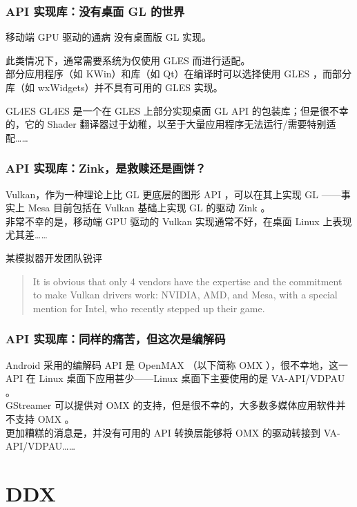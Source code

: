 \documentclass{ctexbeamer}
\begin{document}
\begin{frame}
    \frametitle{API 实现库：没有桌面 GL 的世界}
    \begin{block}{移动端 GPU 驱动的通病}
        没有桌面版 GL 实现。
    \end{block}
    此类情况下，通常需要系统为仅使用 GLES 而进行适配。 \\
    部分应用程序（如 KWin）和库（如 Qt）在编译时可以选择使用 GLES ，而部分库（如 wxWidgets）并不具有可用的 GLES 实现。\\
    \begin{block}{GL4ES}
        GL4ES 是一个在 GLES 上部分实现桌面 GL API 的包装库；但是很不幸的，它的 Shader 翻译器过于幼稚，以至于大量应用程序无法运行/需要特别适配……
    \end{block}
\end{frame}

\begin{frame}
    \frametitle{API 实现库：Zink，是救赎还是画饼？}
    Vulkan，作为一种理论上比 GL 更底层的图形 API ，可以在其上实现 GL ——事实上 Mesa 目前包括在 Vulkan 基础上实现 GL 的驱动 Zink 。\\
    非常不幸的是，移动端 GPU 驱动的 Vulkan 实现通常不好，在桌面 Linux 上表现尤其差……\\
    \begin{block}{某模拟器开发团队锐评}
        \begin{quote}
            It is obvious that only 4 vendors have the expertise and the commitment to make Vulkan drivers work: NVIDIA, AMD, and Mesa, with a special mention for Intel, who recently stepped up their game.
        \end{quote}
    \end{block}
\end{frame}

\begin{frame}
    \frametitle{API 实现库：同样的痛苦，但这次是编解码}
    Android 采用的编解码 API 是 OpenMAX （以下简称 OMX ），很不幸地，这一 API 在 Linux 桌面下应用甚少——Linux 桌面下主要使用的是 VA-API/VDPAU 。\\
    GStreamer 可以提供对 OMX 的支持，但是很不幸的，大多数多媒体应用软件并不支持 OMX 。\\
    更加糟糕的消息是，并没有可用的 API 转换层能够将 OMX 的驱动转接到 VA-API/VDPAU……
\end{frame}

\section{DDX}
\end{document}
